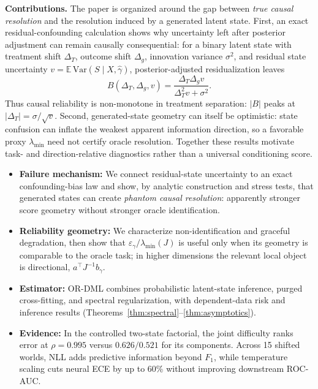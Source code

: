 \documentclass[twoside]{article}
\theoremstyle{definition}
\newcommand{\E}{\mathbb{E}}
\begin{document}
\textbf{Contributions.} The paper is organized around the gap between \emph{true causal resolution} and the resolution induced by a generated latent state. First, an exact residual-confounding calculation shows why uncertainty left after posterior adjustment can remain causally consequential: for a binary latent state with treatment shift $\Delta_T$, outcome shift $\Delta_g$, innovation variance $\sigma^2$, and residual state uncertainty $v=\E\,\mathrm{Var}(S\mid X,\hat\gamma)$, posterior-adjusted residualization leaves
\[
B(\Delta_T,\Delta_g,v)=\frac{\Delta_T\Delta_g v}{\Delta_T^2v+\sigma^2}.
\]
Thus causal reliability is non-monotone in treatment separation: $|B|$ peaks at $|\Delta_T|=\sigma/\sqrt v$. Second, generated-state geometry can itself be optimistic: state confusion can inflate the weakest apparent information direction, so a favorable proxy $\lambda_{\min}$ need not certify oracle resolution. Together these results motivate task- and direction-relative diagnostics rather than a universal conditioning score.
\begin{itemize}\setlength{\itemsep}{0pt}\setlength{\parskip}{0pt}
    \item \textbf{Failure mechanism:} We connect residual-state uncertainty to an exact confounding-bias law and show, by analytic construction and stress tests, that generated states can create \emph{phantom causal resolution}: apparently stronger score geometry without stronger oracle identification.
    \item \textbf{Reliability geometry:} We characterize non-identification and graceful degradation, then show that $\varepsilon_\gamma/\lambda_{\min}(J)$ is useful only when its geometry is comparable to the oracle task; in higher dimensions the relevant local object is directional, $a^\top J^{-1}b_\gamma$.
    \item \textbf{Estimator:} OR-DML combines probabilistic latent-state inference, purged cross-fitting, and spectral regularization, with dependent-data risk and inference results (Theorems~\ref{thm:spectral}--\ref{thm:asymptotics}).
    \item \textbf{Evidence:} In the controlled two-state factorial, the joint difficulty ranks error at $\rho=0.995$ versus $0.626/0.521$ for its components. Across 15 shifted worlds, NLL adds predictive information beyond $F_1$, while temperature scaling cuts neural ECE by up to 60\% without improving downstream ROC-AUC.
\end{itemize}
\end{document}
